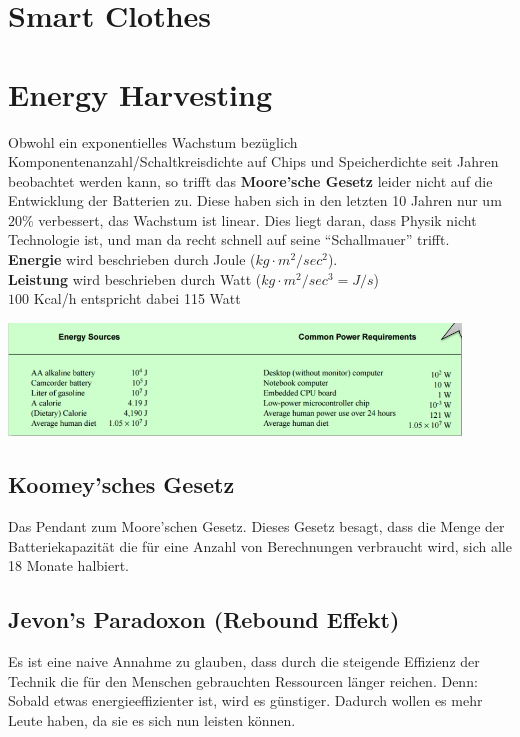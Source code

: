 \documentclass[a4paper]{article}
\begin{document}
\newpage
\section{Smart Clothes}

\newpage
\section{Energy Harvesting}
Obwohl ein exponentielles Wachstum bezüglich Komponentenanzahl/Schaltkreisdichte auf Chips und Speicherdichte seit Jahren beobachtet werden kann, so trifft das\textbf{ Moore'sche Gesetz} leider nicht auf die Entwicklung der Batterien zu. Diese haben sich in den letzten 10 Jahren nur um $20\%$ verbessert, das Wachstum ist linear. Dies liegt daran, dass Physik nicht Technologie ist, und man da recht schnell auf seine ``Schallmauer'' trifft.\\

\textbf{Energie} wird beschrieben durch Joule ($kg\cdot m^2 / sec^2$).\\
\textbf{Leistung} wird beschrieben durch Watt ($kg\cdot m^2 / sec^3 = J / s$) \\
$100$ Kcal/h entspricht dabei 115 Watt
\begin{center}
	\includegraphics[height = 3cm]{Energy.png}
\end{center}

\subsection{Koomey'sches Gesetz}
Das Pendant zum Moore'schen Gesetz. Dieses Gesetz besagt, dass die Menge der Batteriekapazität die für eine Anzahl von Berechnungen verbraucht wird, sich alle 18 Monate halbiert.

\subsection{Jevon's Paradoxon (Rebound Effekt)}
Es ist eine naive Annahme zu glauben, dass durch die steigende Effizienz der Technik die für den Menschen gebrauchten Ressourcen länger reichen. Denn: Sobald etwas energieeffizienter ist, wird es günstiger. Dadurch wollen es mehr Leute haben, da sie es sich nun leisten können.\\
\end{document}
